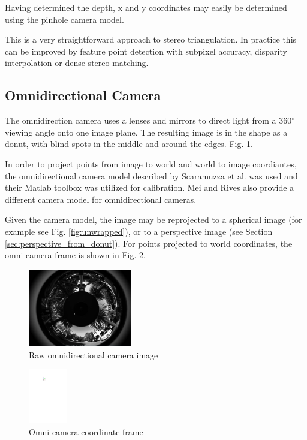 Having determined the depth, x and y coordinates may easily be determined using the pinhole camera model.

This is a very straightforward approach to stereo triangulation.  In practice this can be improved by feature point detection with subpixel accuracy, disparity interpolation or dense stereo matching.


\subsection{Omnidirectional Camera}

The omnidirection camera uses a lenses and mirrors to direct light from a 360$^{\circ}$ viewing angle onto one image plane.  The resulting image is in the shape as a donut, with blind spots in the middle and around the edges. Fig. \ref{fig:omni_donut}.

In order to project points from image to world and world to image coordiantes, the omnidirectional camera model described by Scaramuzza et al. was used and their Matlab toolbox was utilized for calibration. Mei and Rives also provide a different camera model for omnidirectional cameras.

Given the camera model, the image may be reprojected to a spherical image (for example see Fig. \ref{fig:unwrapped}), or to a perspective image (see Section \ref{sec:perspective_from_donut}).  For points projected to world coordinates, the omni camera frame is shown in Fig. \ref{fig:omni_coord_sys}.

\begin{figure}[h]
  \centering
    \includegraphics[width=0.4\textwidth]{chapters/images/donut}
  \caption{Raw omnidirectional camera image}
  \label{fig:omni_donut}
\end{figure}

\begin{figure}[h]
  \centering
    \includegraphics[width=0.15\textwidth]{chapters/images/omni_coord_sys}
  \caption{Omni camera coordinate frame}
  \label{fig:omni_coord_sys}
\end{figure}

